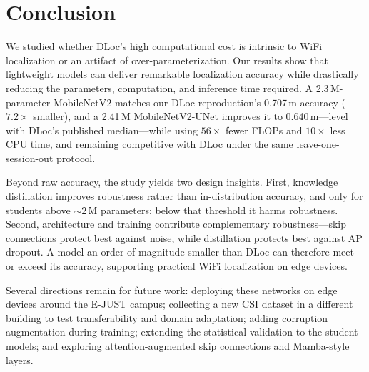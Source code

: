 \documentclass[conference]{IEEEtran}
\begin{document}
\section{Conclusion}
We studied whether DLoc's high computational cost is intrinsic to WiFi localization or an artifact of over-parameterization. Our results show that lightweight models can deliver remarkable localization accuracy while drastically reducing the parameters, computation, and inference time required. A 2.3\,M-parameter MobileNetV2 matches our DLoc reproduction's 0.707\,m accuracy ($7.2\times$ smaller), and a 2.41\,M MobileNetV2-UNet improves it to 0.640\,m---level with DLoc's published median---while using $56\times$ fewer FLOPs and $10\times$ less CPU time, and remaining competitive with DLoc under the same leave-one-session-out protocol.

Beyond raw accuracy, the study yields two design insights. First, knowledge distillation improves robustness rather than in-distribution accuracy, and only for students above ${\sim}2$\,M parameters; below that threshold it harms robustness. Second, architecture and training contribute complementary robustness---skip connections protect best against noise, while distillation protects best against AP dropout. A model an order of magnitude smaller than DLoc can therefore meet or exceed its accuracy, supporting practical WiFi localization on edge devices.

Several directions remain for future work: deploying these networks on edge devices around the E-JUST campus; collecting a new CSI dataset in a different building to test transferability and domain adaptation; adding corruption augmentation during training; extending the statistical validation to the student models; and exploring attention-augmented skip connections and Mamba-style layers.

\nocite{*}



\end{document}

